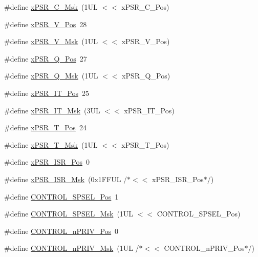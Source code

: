 \begin{DoxyCompactItemize}
\item 
\#define \hyperlink{group__CMSIS__CORE_ga21e2497255d380f956ca0f48d11d0775}{x\+P\+S\+R\+\_\+\+C\+\_\+\+Msk}~(1\+U\+L $<$$<$ x\+P\+S\+R\+\_\+\+C\+\_\+\+Pos)
\item 
\#define \hyperlink{group__CMSIS__CORE_gae0cfbb394490db402623d97e6a979e00}{x\+P\+S\+R\+\_\+\+V\+\_\+\+Pos}~28
\item 
\#define \hyperlink{group__CMSIS__CORE_gab07f94ed3b6ee695f5af719dc27995c2}{x\+P\+S\+R\+\_\+\+V\+\_\+\+Msk}~(1\+U\+L $<$$<$ x\+P\+S\+R\+\_\+\+V\+\_\+\+Pos)
\item 
\#define \hyperlink{group__CMSIS__CORE_gaabb4178d50676a8f19cf8f727f38ace8}{x\+P\+S\+R\+\_\+\+Q\+\_\+\+Pos}~27
\item 
\#define \hyperlink{group__CMSIS__CORE_ga133ac393c38559ae43ac36383e731dd4}{x\+P\+S\+R\+\_\+\+Q\+\_\+\+Msk}~(1\+U\+L $<$$<$ x\+P\+S\+R\+\_\+\+Q\+\_\+\+Pos)
\item 
\#define \hyperlink{group__CMSIS__CORE_gac5be1db1343f776ecd00f0a4ebe70a46}{x\+P\+S\+R\+\_\+\+I\+T\+\_\+\+Pos}~25
\item 
\#define \hyperlink{group__CMSIS__CORE_ga6dc177aab488851bb3b98cf4b420141a}{x\+P\+S\+R\+\_\+\+I\+T\+\_\+\+Msk}~(3\+U\+L $<$$<$ x\+P\+S\+R\+\_\+\+I\+T\+\_\+\+Pos)
\item 
\#define \hyperlink{group__CMSIS__CORE_ga98d801da9a49cda944f52aeae104dd38}{x\+P\+S\+R\+\_\+\+T\+\_\+\+Pos}~24
\item 
\#define \hyperlink{group__CMSIS__CORE_ga30ae2111816e82d47636a8d4577eb6ee}{x\+P\+S\+R\+\_\+\+T\+\_\+\+Msk}~(1\+U\+L $<$$<$ x\+P\+S\+R\+\_\+\+T\+\_\+\+Pos)
\item 
\#define \hyperlink{group__CMSIS__CORE_ga21bff245fb1aef9683f693d9d7bb2233}{x\+P\+S\+R\+\_\+\+I\+S\+R\+\_\+\+Pos}~0
\item 
\#define \hyperlink{group__CMSIS__CORE_gadf8eed87e0081dfe1ef1c78a0ea91afd}{x\+P\+S\+R\+\_\+\+I\+S\+R\+\_\+\+Msk}~(0x1\+F\+F\+U\+L /$\ast$$<$$<$ x\+P\+S\+R\+\_\+\+I\+S\+R\+\_\+\+Pos$\ast$/)
\item 
\#define \hyperlink{group__CMSIS__CORE_ga07eafc53e609895342c6a530e9d01310}{C\+O\+N\+T\+R\+O\+L\+\_\+\+S\+P\+S\+E\+L\+\_\+\+Pos}~1
\item 
\#define \hyperlink{group__CMSIS__CORE_ga70b29840969b06909da21369b0b05b53}{C\+O\+N\+T\+R\+O\+L\+\_\+\+S\+P\+S\+E\+L\+\_\+\+Msk}~(1\+U\+L $<$$<$ C\+O\+N\+T\+R\+O\+L\+\_\+\+S\+P\+S\+E\+L\+\_\+\+Pos)
\item 
\#define \hyperlink{group__CMSIS__CORE_ga51b95bc03ec0d815b459bde0b14a5908}{C\+O\+N\+T\+R\+O\+L\+\_\+n\+P\+R\+I\+V\+\_\+\+Pos}~0
\item 
\#define \hyperlink{group__CMSIS__CORE_gaef3b20d77acb213338f89ce5e7bc36b0}{C\+O\+N\+T\+R\+O\+L\+\_\+n\+P\+R\+I\+V\+\_\+\+Msk}~(1\+U\+L /$\ast$$<$$<$ C\+O\+N\+T\+R\+O\+L\+\_\+n\+P\+R\+I\+V\+\_\+\+Pos$\ast$/)
\end{DoxyCompactItemize}


